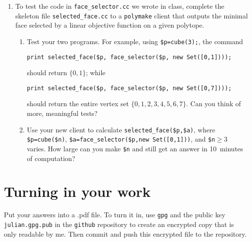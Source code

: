 \documentclass[11pt]{amsart}
\begin{document}
 \begin{enumerate}
   \setlength{\itemsep}{2ex}
 \item To test the code in \texttt{face\_selector.cc} we wrote in class, complete the skeleton file \texttt{selected\_face.cc} to a \texttt{polymake} client that outputs the minimal face selected by a linear objective function on a given polytope. 
\begin{enumerate}
\item Test your two programs. For example, using \verb|$p=cube(3);|,
  the command 
\begin{verbatim}
print selected_face($p, face_selector($p, new Set([0,1])));
\end{verbatim}
should return $\{0,1\}$; while 
\begin{verbatim}
print selected_face($p, face_selector($p, new Set([0,7])));
\end{verbatim}
should return the entire vertex set $\{0,1,2,3,4,5,6,7\}$. Can you think of more, meaningful tests?

\item Use your new client to calculate \verb|selected_face($p,$a)|, where \verb|$p=cube($n)|, \verb|$a=face_selector($p,new Set([0,1]))|, and \verb|$n|$\ge3$ varies. How large can you make \verb|$n| and still get an answer in 10~minutes of computation?
\end{enumerate}
 \end{enumerate}


\bigskip
\section*{Turning in your work}

Put your answers into a .pdf file. To turn it in, use \texttt{gpg} and the public key \texttt{julian.gpg.pub} in the \texttt{github} repository to create an encrypted copy that is only readable by me. Then commit and push this encrypted file to the repository.
\end{document}
